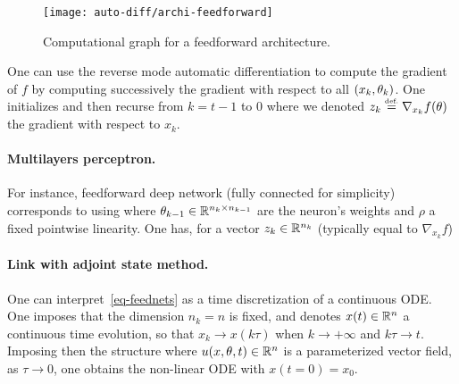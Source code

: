\begin{figure}
\centering
\texttt{[image: auto-diff/archi-feedforward]} 
\caption{\label{fig-mlp}
Computational graph for a feedforward architecture.
}
\end{figure}


One can use the reverse mode automatic differentiation to compute the gradient of $f$ by computing successively the gradient with respect to all $(x_k,\theta_k)$. One initializes
and then recurse from $k=t-1$ to $0$
where we denoted $z_k \stackrel{\mbox{\upshape\tiny def.}}{=} \nabla_{x_{k}} f(\theta)$ the gradient with respect to $x_{k}$.

\paragraph{Multilayers perceptron.}

For instance, feedforward deep network (fully connected for simplicity) corresponds to using 
where $\theta_{k-1} \in \mathbb{R}^{n_{k} \times n_{k-1}}$ are the neuron's weights and $\rho$ a fixed pointwise linearity.
%
One has, for a vector $z_k \in \mathbb{R}^{n_k}$ (typically equal to $\nabla_{x_{k}} f$)


\paragraph{Link with adjoint state method.}

One can interpret~\eqref{eq-feednets} as a time discretization of a continuous ODE. 
%
One imposes that the dimension $n_k=n$ is fixed, and denotes $x(t) \in \mathbb{R}^n$ a continuous time evolution, so that $x_{k} \rightarrow x(k \tau)$ when $k \rightarrow +\infty$ and $k \tau \rightarrow t$. 
%
Imposing then the structure
where $u(x,\theta,t) \in \mathbb{R}^n$ is a parameterized vector field, as $\tau \rightarrow 0$, one obtains the non-linear ODE
with $x(t=0)=x_0$.

